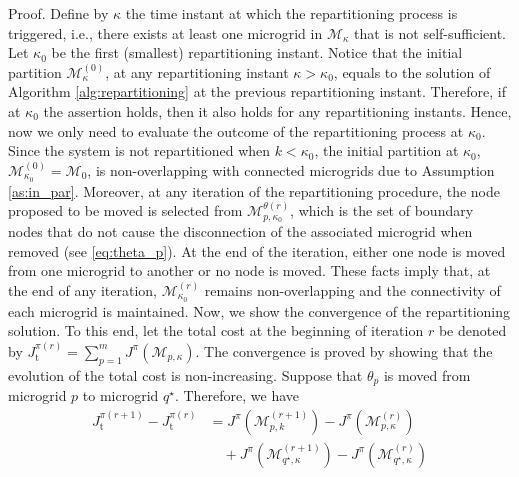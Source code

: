 \begin{pf*}{Proof.}
	Define by $\kappa$ the time instant at which the repartitioning process is triggered, i.e., there exists at least one microgrid in $\boldsymbol{\mathcal{M}}_{\kappa}$ that is not self-sufficient. Let $\kappa_0$ be the first (smallest) repartitioning instant. Notice that the initial partition $\boldsymbol{\mathcal{M}}^{(0)}_{\kappa}$, at any repartitioning instant $\kappa > \kappa_0$, equals to the solution of Algorithm \ref{alg:repartitioning} at the previous repartitioning instant. Therefore, if at $\kappa_0$ the assertion holds, then it also holds for any repartitioning instants. Hence, now we only need to evaluate the outcome of the repartitioning process at $\kappa_0$. 
	Since the system is not repartitioned when $k<\kappa_0$, the initial partition at $\kappa_0$, $\boldsymbol{\mathcal{M}}^{(0)}_{\kappa_0}=\boldsymbol{\mathcal{M}}_0$, is non-overlapping with connected microgrids due to Assumption \ref{as:in_par}. Moreover, at any iteration of the repartitioning procedure, the node proposed to be moved is selected from $\mathcal{M}_{p,{\kappa_0}}^{\theta (r)}$, which is the set of boundary nodes that do not cause the disconnection of the associated microgrid when removed (see \eqref{eq:theta_p}). At the end of the iteration, either one node is moved from one microgrid to another or no node is moved. These facts imply that, at the end of any iteration, $\boldsymbol{\mathcal{M}}^{(r)}_{\kappa_0}$ remains non-overlapping and the connectivity of each microgrid is maintained. 
	Now, we show the convergence of the repartitioning solution. To this end, let the total cost at the beginning of iteration $r$  be denoted by $J^{\pi(r)}_{\mathrm{t}} = \sum_{p=1}^m J^{\pi}(\mathcal{M}_{p,{\kappa}})$. The convergence is proved by showing that the evolution of the total cost is non-increasing. Suppose that $\theta_p$ is moved from microgrid $p$ to microgrid $q^{\star}$. Therefore, we have
	\vspace{-5pt}
	\begin{align*}
	J^{\pi(r+1)}_{\mathrm{t}}- J^{\pi(r)}_{\mathrm{t}} 
	&= J^{\pi}(\mathcal{M}_{p,k}^{(r+1)}) - J^{\pi}(\mathcal{M}_{p,{\kappa}}^{(r)}) \\& \quad + J^{\pi}(\mathcal{M}_{q^{\star},{\kappa}}^{(r+1)}) - J^{\pi}(\mathcal{M}_{q^{\star},{\kappa}}^{(r)})\\

\end{align*}
\end{pf*}
